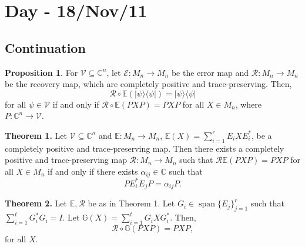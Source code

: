 \documentclass[12pt]{article}
\theoremstyle{definition}
\newtheorem*{proposition}{Proposition}
\newcommand{\C}{\mathbb{C}}
\begin{document}
\section{Day - 18/Nov/11}

\subsection{Continuation}

\begin{proposition}
For $\mathcal{V} \subseteq \C^n$, let $\mathcal{E}:M_n \to M_n$ be the error map and $\mathcal{R}:M_n \to M_n$ be the recovery map, which are completely positive and trace-preserving. Then,
\[
\mathcal{R} \circ \mathbb{E}(|\psi\rangle\langle \psi|)=|\psi\rangle\langle \psi|
\]
for all $\psi \in \mathcal{V}$ if and only if $\mathcal{R} \circ \mathbb{E}(PXP)=PXP$ for all $X \in M_n$, where $P:\C^n \to \mathcal{V}$.
\end{proposition}

\noindent\textbf{Theorem 1.} Let $\mathcal{V} \subseteq \C^n$ and $\mathbb{E}:M_n \to M_n$, $\mathbb{E}(X)=\sum_{i=1}^r E_iXE_i^*$, be a completely positive and trace-preserving map. Then there exists a completely positive and trace-preserving map $\mathcal{R}:M_n \to M_n$ such that $\mathcal{R}\mathbb{E}(PXP)=PXP$ for all $X \in M_n$ if and only if there exists $\alpha_{ij} \in \C$ such that
\[
PE_i^*E_jP = \alpha_{ij}P.
\]

\noindent\textbf{Theorem 2.} Let $\mathbb{E},\mathcal{R}$ be as in Theorem 1. Let $G_i \in \operatorname{span}\{E_j\}_{j=1}^r$ such that $\sum_{i=1}^t G_i^*G_i = I$. Let $\mathbb{G}(X)=\sum_{i=1}^t G_iXG_i^*$. Then,
\[
\mathcal{R} \circ \mathbb{G}(PXP)=PXP,
\]
for all $X$.
\end{document}
